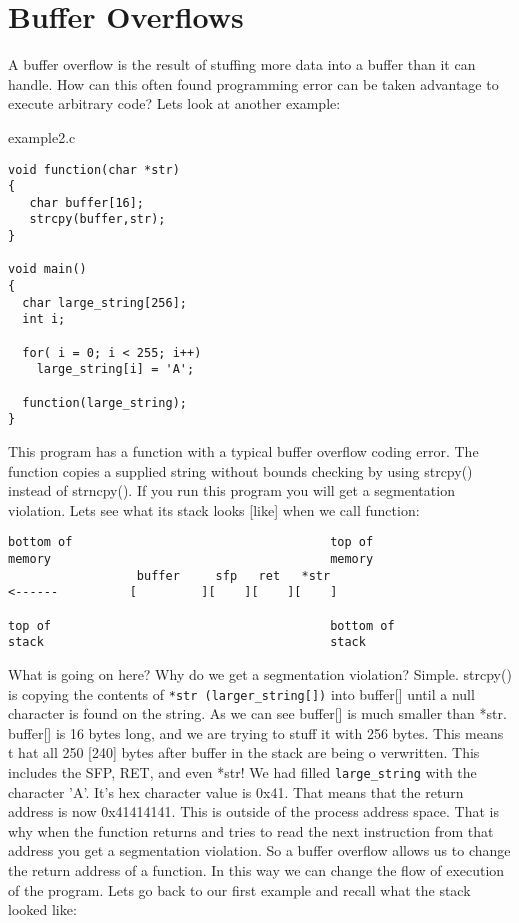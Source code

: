 \documentclass[10pt]{article}
\begin{document}
\section{Buffer Overflows}

A buffer overflow is the result of stuffing more data into a buffer than it can handle. How can this often found 
programming error can be taken advantage to execute arbitrary code? Lets look at another example:

example2.c 

\begin{lstlisting}
void function(char *str) 
{
   char buffer[16];
   strcpy(buffer,str);
}

void main() 
{
  char large_string[256];
  int i;

  for( i = 0; i < 255; i++)
    large_string[i] = 'A';

  function(large_string);
}
\end{lstlisting}

This program has a function with a typical buffer overflow coding error. The function copies a supplied string 
without bounds checking by using strcpy() instead of strncpy(). If you run this program you will get a segmentation violation. Lets see what its stack looks [like] when we call function: 

\begin{verbatim}
bottom of                                    top of
memory                                       memory
                  buffer     sfp   ret   *str
<------          [         ][    ][    ][    ]

top of                                       bottom of
stack                                        stack
\end{verbatim}

What is going on here? Why do we get a segmentation violation? Simple. strcpy() is copying the contents of  
\verb+*str (larger_string[])+ into buffer[] until a null character  is found on the string. As we can see buffer[] is much 
smaller than *str. buffer[] is 16 bytes long, and we are trying to stuff it with 256 bytes. This means t hat all 250 
[240] bytes after buffer in the stack are being o verwritten. This includes the SFP, RET, and even *str! We had 
filled \verb+large_string+ with the character 'A'. It's hex character value is 0x41. That means that the return 
address is now 0x41414141. This is outside of the process address space.  That is why when the function returns 
and tries to read the next instruction from that address you get a segmentation violation. So a buffer overflow 
allows us to change the return address of a function. In this way we can change the flow of execution of the 
program. Lets go back to our first example and recall what the stack looked like: 
\end{document}
